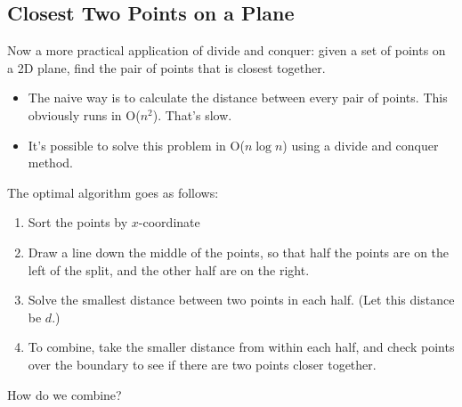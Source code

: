 \documentclass[10pt]{article}
\begin{document}
\subsection*{Closest Two Points on a Plane}
Now a more practical application of divide and conquer: given a set of points on a 2D plane, find the pair of points that is closest together.
\begin{itemize}
    \item The naive way is to calculate the distance between every pair of points.  This obviously runs in O($n^2$).  That's slow.
    \item It's possible to solve this problem in O($n \log n$) using a divide and conquer method.
\end{itemize}
The optimal algorithm goes as follows:
\begin{enumerate}
    \item Sort the points by $x$-coordinate
    \item Draw a line down the middle of the points, so that half the points are on the left of the split, and the other half are on the right.
    \item Solve the smallest distance between two points in each half.  (Let this distance be $d$.)
    \item To combine, take the smaller distance from within each half, and check points over the boundary to see if there are two points closer together.
\end{enumerate}
How do we combine?
\end{document}
